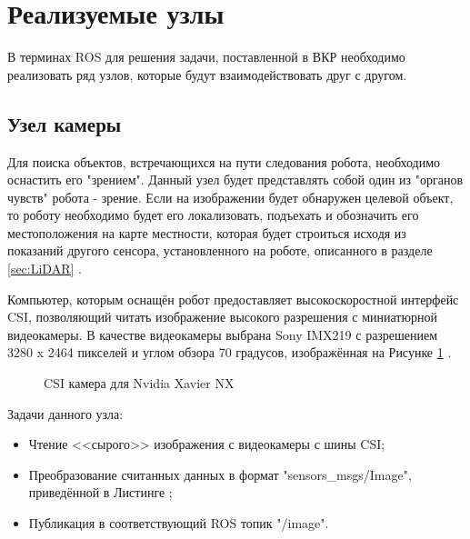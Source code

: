 \documentclass[12pt,a4paper]{scrartcl}
\begin{document}
		\section{Реализуемые узлы}
			В терминах ROS для решения задачи, поставленной в ВКР необходимо реализовать ряд узлов, которые будут взаимодействовать друг с другом.
			
			\subsection{Узел камеры}
			 	Для поиска объектов, встречающихся на пути следования робота, необходимо оснастить его "зрением". Данный узел будет представлять собой один из "органов чувств" робота - зрение. Если на изображении будет обнаружен целевой объект, то роботу необходимо будет его локализовать, подъехать и обозначить его местоположения на карте местности, которая будет строиться исходя из показаний другого сенсора, установленного на роботе, описанного в разделе \ref{sec:LiDAR} .
							 
			 	Компьютер, которым оснащён робот предоставляет высокоскоростной интерфейс CSI, позволяющий читать изображение высокого разрешения с миниатюрной видеокамеры. В качестве видеокамеры выбрана Sony IMX219 с разрешением 3280 x 2464 пикселей и углом обзора 70 градусов, изображённая на Рисунке \ref{fig:csiCam} . 
			 	\begin{figure}[h]
					\caption{CSI камера для Nvidia Xavier NX}
					\label{fig:csiCam}
				\end{figure}
				
				Задачи данного узла:
				\begin{itemize}
					\item Чтение <<сырого>> изображения с видеокамеры с шины CSI;
					\item Преобразование считанных данных в формат "sensors\_msgs/Image", приведённой в Листинге  ;
					\item Публикация в соответствующий ROS топик "/image".
				\end{itemize}
				
\end{document}
